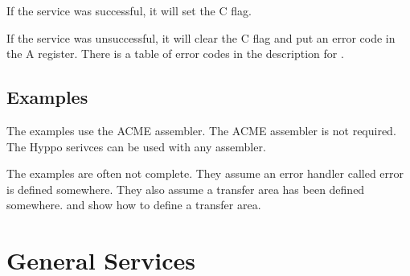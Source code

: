 If the service was successful, it will set the C flag.

If the service was unsuccessful, it will clear the C flag and put an error code
in the A register. There is a table of error codes in the description for
.

\subsection{Examples}
The examples use the ACME assembler. The ACME assembler is not required. The
Hyppo serivces can be used with any assembler.

The examples are often not complete. They assume an error handler called error
is defined somewhere. They also assume a transfer area has been defined
somewhere.  and 
show how to define a transfer area.


\newpage
\section{General Services}


